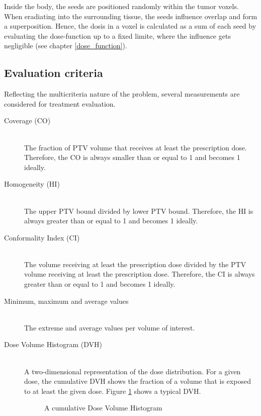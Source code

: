 \documentclass[12pt]{article}
\begin{document}
Inside the body, the seeds are positioned randomly within the tumor voxels. When eradiating into the surrounding tissue, the seeds influence overlap and form a superposition. Hence, the dosis in a voxel is calculated as a sum of each seed by evaluating the dose-function up to a fixed limite, where the influence gets negligible (see chapter \ref{dose_function}).

\subsection{Evaluation criteria}
	Reflecting the multicriteria nature of the problem, several measurements are considered for treatment evaluation.
	\begin{description}
		\item[Coverage (CO)]~\\
			The fraction of PTV volume that receives at least the prescription dose. Therefore, the CO is always smaller than or equal to 1 and becomes 1 ideally.
		\item[Homogeneity (HI)]~\\
			The upper PTV bound divided by lower PTV bound. Therefore, the HI is always greater than or equal to 1 and becomes 1 ideally.
		\item[Conformality Index (CI)]~\\
			The volume receiving at least the prescription dose divided by the PTV volume receiving at least the prescription dose. Therefore, the CI is always greater than or equal to 1 and becomes 1 ideally.
		\item[Minimum, maximum and average values]~\\
			The extreme and average values per volume of interest.
		\item[Dose Volume Histogram (DVH)]~\\
			A two-dimensional representation of the dose distribution. For a given dose, the cumulative DVH shows the fraction of a volume that is exposed to at least the given dose. Figure \ref{fig:evalCritDVH} shows a typical DVH.
			\begin{figure}[ht]
				\centering
				 
				\caption{A cumulative Dose Volume Histogram}
				\label{fig:evalCritDVH}
			\end{figure}
			


\end{description}
\end{document}
